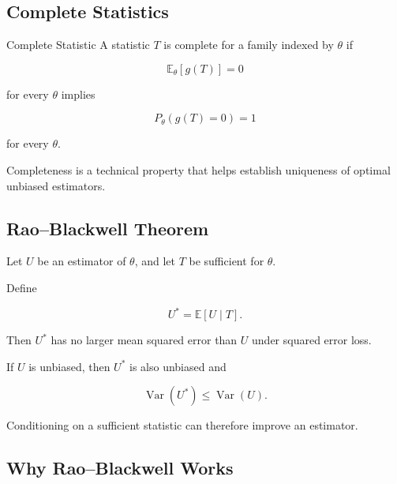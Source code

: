 \subsection{Complete Statistics}
\label{subsec:complete-statistics}

\begin{definitionbox}{Complete Statistic}
A statistic \(T\) is complete for a family indexed by \(\theta\) if

\[
\mathbb{E}_\theta[g(T)]=0
\]

for every \(\theta\) implies

\[
\boxed{
P_\theta(g(T)=0)=1
}
\]

for every \(\theta\).
\end{definitionbox}

Completeness is a technical property that helps establish uniqueness of
optimal unbiased estimators.

\subsection{Rao--Blackwell Theorem}
\label{subsec:rao-blackwell}

\begin{theorem}
Let \(U\) be an estimator of \(\theta\), and let \(T\) be sufficient for
\(\theta\).

Define

\[
\boxed{
U^*
=
\mathbb{E}[U\mid T].
}
\]

Then \(U^*\) has no larger mean squared error than \(U\) under squared
error loss.

If \(U\) is unbiased, then \(U^*\) is also unbiased and

\[
\boxed{
\operatorname{Var}(U^*)
\leq
\operatorname{Var}(U).
}
\]
\end{theorem}

Conditioning on a sufficient statistic can therefore improve an
estimator.

\subsection{Why Rao--Blackwell Works}
\label{subsec:why-rao-blackwell}


